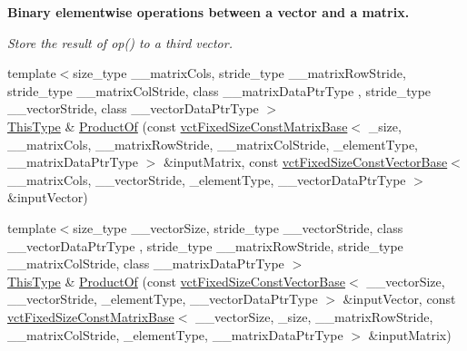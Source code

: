 \begin{Indent}{\bf Binary elementwise operations between a vector and a matrix.}\par
{\em Store the result of op() to a third vector. }\begin{DoxyCompactItemize}
\item 
{\footnotesize template$<$size\-\_\-type \-\_\-\-\_\-matrix\-Cols, stride\-\_\-type \-\_\-\-\_\-matrix\-Row\-Stride, stride\-\_\-type \-\_\-\-\_\-matrix\-Col\-Stride, class \-\_\-\-\_\-matrix\-Data\-Ptr\-Type , stride\-\_\-type \-\_\-\-\_\-vector\-Stride, class \-\_\-\-\_\-vector\-Data\-Ptr\-Type $>$ }\\\hyperlink{classvct_fixed_size_const_vector_base_a071063bc4fa43112cc287b2dbef53180}{This\-Type} \& \hyperlink{classvct_fixed_size_vector_base_ad9749268a988b7cf806d2d0933bbaa19}{Product\-Of} (const \hyperlink{classvct_fixed_size_const_matrix_base}{vct\-Fixed\-Size\-Const\-Matrix\-Base}$<$ \-\_\-size, \-\_\-\-\_\-matrix\-Cols, \-\_\-\-\_\-matrix\-Row\-Stride, \-\_\-\-\_\-matrix\-Col\-Stride, \-\_\-element\-Type, \-\_\-\-\_\-matrix\-Data\-Ptr\-Type $>$ \&input\-Matrix, const \hyperlink{classvct_fixed_size_const_vector_base}{vct\-Fixed\-Size\-Const\-Vector\-Base}$<$ \-\_\-\-\_\-matrix\-Cols, \-\_\-\-\_\-vector\-Stride, \-\_\-element\-Type, \-\_\-\-\_\-vector\-Data\-Ptr\-Type $>$ \&input\-Vector)
\item 
{\footnotesize template$<$size\-\_\-type \-\_\-\-\_\-vector\-Size, stride\-\_\-type \-\_\-\-\_\-vector\-Stride, class \-\_\-\-\_\-vector\-Data\-Ptr\-Type , stride\-\_\-type \-\_\-\-\_\-matrix\-Row\-Stride, stride\-\_\-type \-\_\-\-\_\-matrix\-Col\-Stride, class \-\_\-\-\_\-matrix\-Data\-Ptr\-Type $>$ }\\\hyperlink{classvct_fixed_size_const_vector_base_a071063bc4fa43112cc287b2dbef53180}{This\-Type} \& \hyperlink{classvct_fixed_size_vector_base_a89845acf29f13d22068a1e4fbd77bf40}{Product\-Of} (const \hyperlink{classvct_fixed_size_const_vector_base}{vct\-Fixed\-Size\-Const\-Vector\-Base}$<$ \-\_\-\-\_\-vector\-Size, \-\_\-\-\_\-vector\-Stride, \-\_\-element\-Type, \-\_\-\-\_\-vector\-Data\-Ptr\-Type $>$ \&input\-Vector, const \hyperlink{classvct_fixed_size_const_matrix_base}{vct\-Fixed\-Size\-Const\-Matrix\-Base}$<$ \-\_\-\-\_\-vector\-Size, \-\_\-size, \-\_\-\-\_\-matrix\-Row\-Stride, \-\_\-\-\_\-matrix\-Col\-Stride, \-\_\-element\-Type, \-\_\-\-\_\-matrix\-Data\-Ptr\-Type $>$ \&input\-Matrix)
\end{DoxyCompactItemize}
\end{Indent}
